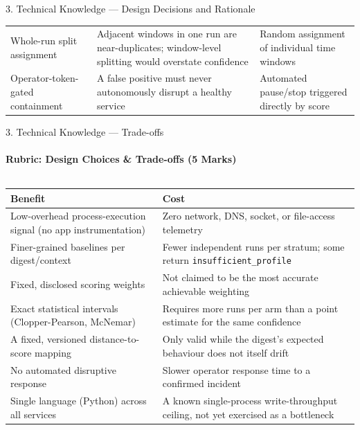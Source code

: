 \documentclass[aspectratio=169, 11pt]{beamer}
\begin{document}
\begin{frame}{3. Technical Knowledge --- Design Decisions and Rationale}
\begin{table}
\begin{tabular}{p{3.1cm} p{4.6cm} p{4.0cm}}
Whole-run split assignment
& Adjacent windows in one run are near-duplicates; window-level splitting would overstate confidence
& Random assignment of individual time windows \\

Operator-token-gated containment
& A false positive must never autonomously disrupt a healthy service
& Automated pause/stop triggered directly by score \\
\bottomrule
\end{tabular}
\end{table}
\end{frame}

\begin{frame}{3. Technical Knowledge --- Trade-offs}
\framesubtitle{Rubric: Design Choices \& Trade-offs (5 Marks)}

\begin{columns}[T]
\scriptsize
\begin{tabular}{@{}p{3.5cm}p{4.4cm}@{}}
\toprule
\textbf{Benefit} & \textbf{Cost} \\
\midrule
Low-overhead process-execution signal (no app instrumentation) & Zero network, DNS, socket, or file-access telemetry \\
Finer-grained baselines per digest/context & Fewer independent runs per stratum; some return \texttt{insufficient\_profile} \\
Fixed, disclosed scoring weights & Not claimed to be the most accurate achievable weighting \\
Exact statistical intervals (Clopper-Pearson, McNemar) & Requires more runs per arm than a point estimate for the same confidence \\
A fixed, versioned distance-to-score mapping & Only valid while the digest's expected behaviour does not itself drift \\
No automated disruptive response & Slower operator response time to a confirmed incident \\
Single language (Python) across all services & A known single-process write-throughput ceiling, not yet exercised as a bottleneck \\
\bottomrule
\end{tabular}


\end{columns}
\end{frame}
\end{document}
